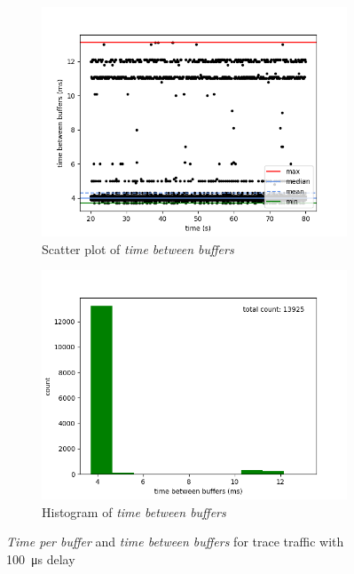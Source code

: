 \begin{figure}[H]
    \begin{subfigure}[t]{0.5\textwidth}
        \centering
        \includegraphics[scale=0.45]{img/trace_wait_100us_between_buffers_scatter.png}
        \caption{Scatter plot of \textit{time between buffers}}
    \end{subfigure}%
    \begin{subfigure}[t]{0.5\textwidth}
        \centering
        \includegraphics[scale=0.45]{img/trace_wait_100us_between_buffers_hist.png}
        \caption{Histogram of \textit{time between buffers}}
    \end{subfigure}

    \caption{\textit{Time per buffer} and \textit{time between buffers} for trace traffic with \SI{100}{\micro\second} delay}
    \label{evaluation/results/trace-100us-delay/plots}
\end{figure}

